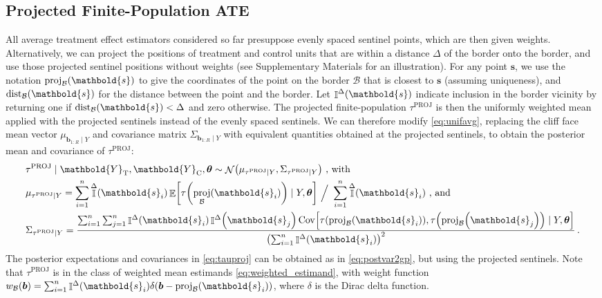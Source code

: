 \documentclass[letter,12pt]{article}
\DeclarePairedDelimiter{\parenthesis}{\lparen}{\rparen}
\DeclarePairedDelimiter{\squarebracket}{\lbrack}{\rbrack}
\newcommand{\del}[1]{\parenthesis*{#1}}
\newcommand{\sbr}[1]{\squarebracket*{#1}}
\DeclareMathOperator{\E}{\mathbb{E}}
\DeclareMathOperator{\cov}{{Cov}}
\DeclareMathOperator{\Ind}{\mathbb{I}}
\DeclareMathOperator{\normal}{\mathcal{N}}
\newcommand{\treat}{\mathrm{T}}
\newcommand{\ctrol}{\mathrm{C}}
\newcommand{\svec}{\mathbold{s}}
\newcommand{\Yvec}{\mathbold{Y}}
\newcommand{\yt}{\Yvec_{\treat}}
\newcommand{\yc}{\Yvec_{\ctrol}}
\newcommand{\border}{\mathcal{B}}
\newcommand{\sentinel}{\bm{b}}
\newcommand{\numsent}{R}
\newcommand{\sentinels}{\sentinel_{1:\numsent}}
\newcommand{\tauproj}{\tau^{\mathrm{PROJ}}}
\DeclareMathOperator{\proj}{proj}
\DeclareMathOperator{\dist}{dist}
\newcommand{\buffer}{\Delta}
\newcommand{\vicinity}[1]{\Ind^\buffer\del{#1}}
\newcommand{\hyperparam}{\bm{\theta}}
\newcommand{\weightb}{w_{\border}}
\begin{document}
\hypertarget{projected-finite-population-ate}{%
\subsection{Projected Finite-Population ATE}\label{projected-finite-population-ate}}

All average treatment effect estimators considered so far presuppose evenly spaced sentinel points, which are then given weights.
Alternatively, we can project the positions of treatment and control units that are within a distance \(\buffer\) of the border onto the border, and use those projected sentinel positions without weights (see Supplementary Materials for an illustration).
For any point \(\svec\), we use the notation \(\proj_{\border}\del{\svec}\) to give the coordinates of the point on the border \(\border\) that is closest to \(\svec\) (assuming uniqueness), and \(\dist_{\border}\del{\svec}\) for the distance between the point and the border.
Let \(\vicinity{\svec}\) indicate inclusion in the border vicinity by returning one if \(\dist_{\border}\del{\svec} < \buffer\) and zero otherwise.
The projected finite-population \(\tauproj\) is then the uniformly weighted mean applied with the projected sentinels instead of the evenly spaced sentinels.
We can therefore modify \eqref{eq:unifavg}, replacing the cliff face mean vector \(\mu_{\sentinels \mid Y}\)
and covariance matrix \(\Sigma_{\sentinels \mid Y}\)
with equivalent quantities obtained at the projected sentinels,
to obtain the posterior mean and covariance of \(\tauproj\):
\begin{equation}\begin{split}
    &\tauproj \mid \yt{}, \yc{}, \hyperparam \sim \normal\del{\mu_{\tauproj \mid Y}, \Sigma_{\tauproj \mid Y}}\ \text{, with} \\
    &\mu_{\tauproj \mid Y} = 
    \sum_{i=1}^{n}
    \vicinity{\svec_i}
    \E\sbr{
        \tau\del{
            \proj_{\border}\del{\svec_i}
        }
        \mid Y, \hyperparam
    } 
    \ 
    \Big/
    \ 
        \sum_{i=1}^{n}
        \vicinity{\svec_i}
    \ \text{, and}\\
    &\Sigma_{\tauproj \mid Y} = 
    \frac{
        \sum_{i=1}^{n} 
        \sum_{j=1}^{n} 
        \vicinity{\svec_i}
        \vicinity{\svec_j}
        \cov\sbr{
            \tau\del{
                \proj_{\border}\del{\svec_i}
            },
            \tau\del{
                \proj_{\border}\del{\svec_j}
            }
            \mid Y, \hyperparam
        }
    }{
        \del{
            \sum_{i=1}^{n}
            \vicinity{\svec_i}
        }^2
    }
    \,.
\end{split}
\label{eq:tauproj}
\end{equation}
The posterior expectations and covariances in \eqref{eq:tauproj} can be obtained as in \eqref{eq:postvar2gp}, but using the projected sentinels.
Note that \(\tauproj\) is in the class of weighted mean estimands \eqref{eq:weighted_estimand},
with weight function \(\weightb(\sentinel) = \sum_{i=1}^{n} \vicinity{\svec_i} \delta\del{ \sentinel - \proj_\border(\svec_i)}\), where \(\delta\) is the Dirac delta function.
\end{document}
